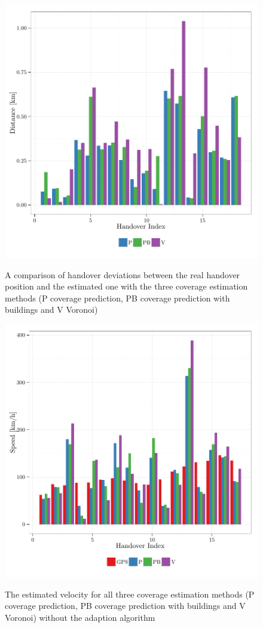 \documentclass[twocolumn]{bmcart}%
\begin{document}
\begin{backmatter}
	
	\begin{figure}[h!]
	
		\caption{ A comparison of handover deviations between the real handover position and the estimated one with the three coverage estimation methods (P coverage prediction, PB coverage prediction with buildings and V Voronoi)
		}
		\includegraphics[width=0.9\columnwidth]{images/563_HandoverDeviation}
			\label{fig:handoverdeviation}
	\end{figure}
	
	
	\begin{figure}[h!]
		
		\caption{ The estimated velocity for all three coverage estimation methods (P coverage prediction, PB coverage prediction with buildings and V Voronoi) without the adaption algorithm
		}
		\includegraphics[width=0.9\columnwidth]{images/563_SpeedWithoutAdaption}
		\label{fig:velocity}
	\end{figure}
	

\end{backmatter}
\end{document}
